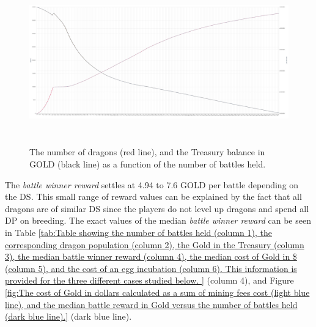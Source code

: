 \documentclass[12pt]{article}
\begin{document}
{\begin{figure}[H]
	\begin{Center}
		\includegraphics[width=6.27in,height=2.79in]{./media/CS1image1.png}
		\caption{The number of dragons (red line), and the Treasury balance in GOLD (black line)  as a function of the number of battles held.}
		\label{fig:The number of dragons (red line) as a function of the number of battles held, and the Treasury balance in GOLD (black line)}
	\end{Center}
\end{figure}




The \textit{battle winner reward} settles at 4.94 to 7.6 GOLD per battle depending on the DS\textit{.} This small range of reward values can be explained by the fact that all dragons are of similar DS since the players do not level up dragons and spend all DP on breeding. The exact values of the median \textit{battle winner reward }can be seen in  Table \ref{tab:Table showing the number of battles held (column 1), the corresponding dragon population (column 2), the Gold in the Treasury (column 3), the median battle winner reward (column 4), the median cost of Gold in $ (column 5), and the cost of an egg incubation (column 6).  This information is provided for the three different cases studied below. } (column 4), and Figure \ref{fig:The cost of Gold in dollars calculated as a sum of mining fees cost (light blue line), and the median battle reward in Gold versus the number of battles held (dark blue line).} (dark blue line).\par




}
\end{document}
